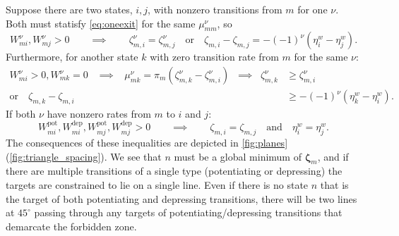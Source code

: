 \documentclass[12pt]{article}
\newcommand{\eqm}{\pi}
\newcommand{\etwm}{\eta^w}
\newcommand{\dgnm}{\zeta}
\newcommand{\dgn}{\boldsymbol{\dgnm}}
\newcommand{\Wm}{W}
\newcommand{\kktm}{\mu}
\newcommand{\pot}{^{\text{pot}}}
\newcommand{\dep}{^{\text{dep}}}
\begin{document}
Suppose there are two states, \(i,j\), with nonzero transitions from \(m\) for one \(\nu\).
Both must statisfy \cref{eq:oneexit} for the same \(\kktm^\nu_{mm}\), so
%
\begin{equation}\label{eq:twoexits}
  \Wm^\nu_{mi}, \Wm^\nu_{mj} > 0
  \qquad \implies \qquad
  \dgnm^\nu_{m,i} = \dgnm^\nu_{m,j}
  \quad \text{or}\quad
  \dgnm_{m,i} - \dgnm_{m,j} = - (-1)^\nu (\etwm_i - \etwm_j).
\end{equation}
%
Furthermore, for another state \(k\) with zero transition rate from \(m\) for the same \(\nu\):
%
\begin{equation}\label{eq:nonexit}
\begin{aligned}
  \Wm^\nu_{mi} > 0, \Wm^\nu_{mk} = 0 
  \;\;\; \implies \;\;\;
  \kktm^\nu_{mk} = \eqm_m (\dgnm^\nu_{m,k} - \dgnm^\nu_{m,i})
  \;\; \implies \;\;
  \dgnm^\nu_{m,k} &\geq \dgnm^\nu_{m,i} \\
  \text{or}\quad
  \dgnm_{m,k} - \dgnm_{m,i} &\geq - (-1)^\nu (\etwm_k - \etwm_i).
\end{aligned}
\end{equation}
%
If both \(\nu\) have nonzero rates from \(m\) to \(i\) and \(j\):
%
\begin{equation}\label{eq:twodoubleexits}
  \Wm\pot_{mi}, \Wm\dep_{mi}, \Wm\pot_{mj}, \Wm\dep_{mj} > 0
  \qquad \implies \qquad
  \dgnm_{m,i} = \dgnm_{m,j} 
  \quad \text{and} \quad
  \etwm_i = \etwm_j.
\end{equation}
%
The consequences of these inequalities are depicted in \cref{fig:planes}(\ref{fig:triangle_spacing}).
We see that \(n\) must be a global minimum of \(\dgn_m\), and if there are multiple transitions of a single type (potentiating or depressing) the targets are constrained to lie on a single line.
Even if there is no state \(n\) that is the target of both potentiating and depressing transitions, there will be two lines at \(45^\circ \) passing through any targets of potentiating/depressing transitions that demarcate the forbidden zone.
\end{document}
